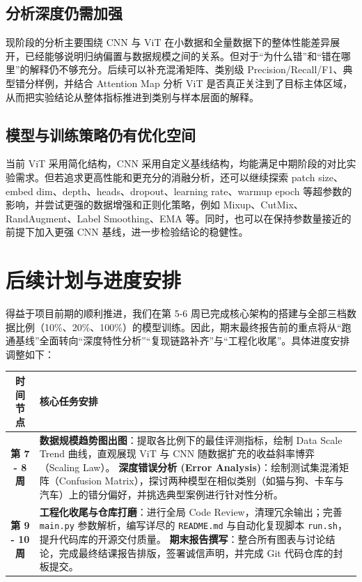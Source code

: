 \documentclass[a4paper, 12pt]{article}
\begin{document}
\subsection{分析深度仍需加强}
现阶段的分析主要围绕 CNN 与 ViT 在小数据和全量数据下的整体性能差异展开，已经能够说明归纳偏置与数据规模之间的关系。但对于“为什么错”和“错在哪里”的解释仍不够充分。后续可以补充混淆矩阵、类别级 Precision/Recall/F1、典型错分样例，并结合 Attention Map 分析 ViT 是否真正关注到了目标主体区域，从而把实验结论从整体指标推进到类别与样本层面的解释。

\subsection{模型与训练策略仍有优化空间}
当前 ViT 采用简化结构，CNN 采用自定义基线结构，均能满足中期阶段的对比实验需求。但若追求更高性能和更充分的消融分析，还可以继续探索 patch size、embed dim、depth、heads、dropout、learning rate、warmup epoch 等超参数的影响，并尝试更强的数据增强和正则化策略，例如 Mixup、CutMix、RandAugment、Label Smoothing、EMA 等。同时，也可以在保持参数量接近的前提下加入更强 CNN 基线，进一步检验结论的稳健性。

\section{后续计划与进度安排}

得益于项目前期的顺利推进，我们在第 5-6 周已完成核心架构的搭建与全部三档数据比例（10\%、20\%、100\%）的模型训练。因此，期末最终报告前的重点将从“跑通基线”全面转向“深度特性分析”“复现链路补齐”与“工程化收尾”。具体进度安排调整如下：

\begin{table}[H]
    \centering
    \renewcommand{\arraystretch}{1.5}
    \begin{tabularx}{\textwidth}{c|X}
        \toprule
        \textbf{时间节点} & \textbf{核心任务安排} \\
        \midrule
        \textbf{第 7 - 8 周} & 
        \textbf{数据规模趋势图出图}：提取各比例下的最佳评测指标，绘制 Data Scale Trend 曲线，直观展现 ViT 与 CNN 随数据扩充的收益斜率博弈（Scaling Law）。 \newline
        \textbf{深度错误分析 (Error Analysis)}：绘制测试集混淆矩阵（Confusion Matrix），探讨两种模型在相似类别（如猫与狗、卡车与汽车）上的错分偏好，并挑选典型案例进行针对性分析。 \\
        \hline
        \textbf{第 9 - 10 周} & 
        \textbf{工程化收尾与仓库打磨}：进行全局 Code Review，清理冗余输出；完善 \texttt{main.py} 参数解析，编写详尽的 \texttt{README.md} 与自动化复现脚本 \texttt{run.sh}，提升代码库的开源交付质量。 \newline
        \textbf{期末报告撰写}：整合所有图表与讨论结论，完成最终结课报告排版，签署诚信声明，并完成 Git 代码仓库的封板提交。 \\
        \bottomrule
    \end{tabularx}
\end{table}
\end{document}

